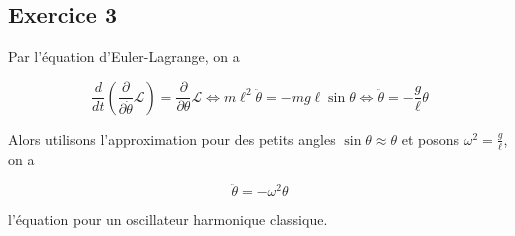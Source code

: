 \documentclass[french]{article}
\begin{document}
	\subsection*{Exercice 3}
	
	Par l'équation d'Euler-Lagrange, on a
	
	\begin{equation}
		\frac{d}{dt} \left(\frac{\partial}{\partial \dot{\theta}} \mathcal{L}\right) = \frac{\partial}{\partial \theta} \mathcal{L} \iff m \ell^2 \ddot{\theta} = -mg\ell \sin\theta \iff \ddot{\theta} = -\frac{g}{\ell} \theta
	\end{equation}
	
	Alors utilisons l'approximation pour des petits angles $\sin \theta \approx \theta$ et posons $\omega^2 = \frac{g}{\ell}$, on a
	
	\begin{equation}
		\ddot{\theta} = -\omega^2 \theta
	\end{equation}
	
	l'équation pour un oscillateur harmonique classique.
	
\end{document}
